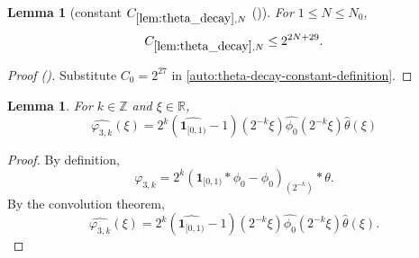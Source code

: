 \documentclass[12pt,reqno]{amsart}
\newcommand{\auto}{{({\tiny\faCar})}}
\theoremstyle{plain}
\newtheorem{lemma}[theorem]{Lemma}
\numberwithin{equation}{section}
\theoremstyle{remark}
\newcommand{\using}[1]{}
\begin{document}
\begin{lemma}[constant $C_{\ref{lem:theta_decay},N}$ \auto]\label{constant theta decay}\using{lem:theta_decay}
For $1\le N\le N_0$,
\begin{equation}\label{constant theta decay bound}
C_{\ref{lem:theta_decay},N}\le2^{2N+29}.
\end{equation}
\end{lemma}
\begin{proof}[Proof \auto]
Substitute $C_0=2^{27}$ in \eqref{auto:theta-decay-constant-definition}.
\end{proof}


\begin{lemma}\label{lem:ft_phi3_eq}
For $k\in\mathbb{Z}$ and $\xi\in\mathbb{R}$,
\begin{equation}\label{auto:varphi-three-Fourier-transform} \widehat{\varphi_{3,k}}(\xi) = 2^k(\widehat{\mathbf{1}_{[0,1)}}-1)(2^{-k}\xi)\widehat{\phi_0}(2^{-k}\xi)\widehat{\theta}(\xi) \end{equation}
\end{lemma}

\begin{proof}
By definition,
\[\varphi_{3,k} = 2^k (\mathbf{1}_{[0,1)} * \phi_0 - \phi_0)_{(2^{-k}) }*\theta.\]
By the convolution theorem,
\[\widehat{\varphi_{3,k}}(\xi) = 2^k(\widehat{\mathbf{1}_{[0,1)}}-1)(2^{-k}\xi)\widehat{\phi_0}(2^{-k}\xi)\widehat{\theta}(\xi).\]
\end{proof}
\end{document}
